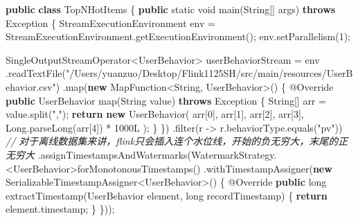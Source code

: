 \documentclass[cn,11pt,chinese]{elegantbook}
\newenvironment{Shaded}{}{}
\newcommand{\AttributeTok}[1]{\textcolor[rgb]{0.49,0.56,0.16}{#1}}
\newcommand{\BuiltInTok}[1]{#1}
\newcommand{\CommentTok}[1]{\textcolor[rgb]{0.38,0.63,0.69}{\textit{#1}}}
\newcommand{\DataTypeTok}[1]{\textcolor[rgb]{0.56,0.13,0.00}{#1}}
\newcommand{\DecValTok}[1]{\textcolor[rgb]{0.25,0.63,0.44}{#1}}
\newcommand{\FunctionTok}[1]{\textcolor[rgb]{0.02,0.16,0.49}{#1}}
\newcommand{\KeywordTok}[1]{\textcolor[rgb]{0.00,0.44,0.13}{\textbf{#1}}}
\newcommand{\NormalTok}[1]{#1}
\newcommand{\StringTok}[1]{\textcolor[rgb]{0.25,0.44,0.63}{#1}}
\begin{document}
\begin{Shaded}
\begin{Highlighting}[]
\KeywordTok{public} \KeywordTok{class}\NormalTok{ TopNHotItems \{}
    \KeywordTok{public} \DataTypeTok{static} \DataTypeTok{void} \FunctionTok{main}\NormalTok{(}\BuiltInTok{String}\NormalTok{[] args) }\KeywordTok{throws} \BuiltInTok{Exception}\NormalTok{ \{}
\NormalTok{        StreamExecutionEnvironment env = StreamExecutionEnvironment.}\FunctionTok{getExecutionEnvironment}\NormalTok{();}
\NormalTok{        env.}\FunctionTok{setParallelism}\NormalTok{(}\DecValTok{1}\NormalTok{);}

\NormalTok{        SingleOutputStreamOperator\textless{}UserBehavior\textgreater{} userBehaviorStream = env}
\NormalTok{                .}\FunctionTok{readTextFile}\NormalTok{(}\StringTok{"/Users/yuanzuo/Desktop/Flink1125SH/src/main/resources/UserBehavior.csv"}\NormalTok{)}
\NormalTok{                .}\FunctionTok{map}\NormalTok{(}\KeywordTok{new}\NormalTok{ MapFunction\textless{}}\BuiltInTok{String}\NormalTok{, UserBehavior\textgreater{}() \{}
                    \AttributeTok{@Override}
                    \KeywordTok{public}\NormalTok{ UserBehavior }\FunctionTok{map}\NormalTok{(}\BuiltInTok{String}\NormalTok{ value) }\KeywordTok{throws} \BuiltInTok{Exception}\NormalTok{ \{}
                        \BuiltInTok{String}\NormalTok{[] arr = value.}\FunctionTok{split}\NormalTok{(}\StringTok{","}\NormalTok{);}
                        \KeywordTok{return} \KeywordTok{new} \FunctionTok{UserBehavior}\NormalTok{(}
\NormalTok{                                arr[}\DecValTok{0}\NormalTok{], arr[}\DecValTok{1}\NormalTok{], arr[}\DecValTok{2}\NormalTok{], arr[}\DecValTok{3}\NormalTok{],}
                                \BuiltInTok{Long}\NormalTok{.}\FunctionTok{parseLong}\NormalTok{(arr[}\DecValTok{4}\NormalTok{]) * }\DecValTok{1000L}
\NormalTok{                        );}
\NormalTok{                    \}}
\NormalTok{                \})}
\NormalTok{                .}\FunctionTok{filter}\NormalTok{(r {-}\textgreater{} r.}\FunctionTok{behaviorType}\NormalTok{.}\FunctionTok{equals}\NormalTok{(}\StringTok{"pv"}\NormalTok{))}
                \CommentTok{// 对于离线数据集来讲，flink只会插入连个水位线，开始的负无穷大，末尾的正无穷大}
\NormalTok{                .}\FunctionTok{assignTimestampsAndWatermarks}\NormalTok{(WatermarkStrategy.\textless{}UserBehavior\textgreater{}}\FunctionTok{forMonotonousTimestamps}\NormalTok{()}
\NormalTok{                        .}\FunctionTok{withTimestampAssigner}\NormalTok{(}\KeywordTok{new}\NormalTok{ SerializableTimestampAssigner\textless{}UserBehavior\textgreater{}() \{}
                            \AttributeTok{@Override}
                            \KeywordTok{public} \DataTypeTok{long} \FunctionTok{extractTimestamp}\NormalTok{(UserBehavior element, }\DataTypeTok{long}\NormalTok{ recordTimestamp) \{}
                                \KeywordTok{return}\NormalTok{ element.}\FunctionTok{timestamp}\NormalTok{;}
\NormalTok{                            \}}
\NormalTok{                        \}));}


\end{Highlighting}
\end{Shaded}
\end{document}
